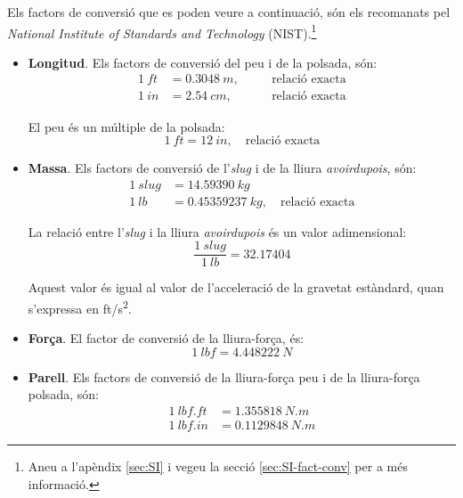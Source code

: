 Els factors de conversió que es poden veure a continuació, són els recomanats pel \textit{National Institute of Standards and Technology} (NIST).\footnote{Aneu a l'apèndix \ref{sec:SI} i vegeu la secció \ref{sec:SI-fact-conv} per a més informació.}

\begin{itemize}
    \item \textbf{Longitud}. Els factors de conversió del peu i de la polsada, són:
    \begin{subequations}
    \begin{alignat}{3}
      \qty{1}{ft} &= \qty{0,3048}{m}, &&\quad\text{relació exacta} \\
      \qty{1}{in} &= \qty{2,54}{cm}, &&\quad\text{relació exacta}
    \end{alignat}
    \end{subequations}

    El peu és un múltiple  de la polsada:
    \begin{equation}
      \qty{1}{ft} = \qty{12}{in},\quad\text{relació exacta}
    \end{equation}

    \item \textbf{Massa}. Els factors de conversió de l'\textit{slug}  i de la lliura \textit{avoirdupois}, són:
    \begin{subequations}
    \begin{align}
      \qty{1}{slug} &= \qty{14,59390}{kg} \\
      \qty{1}{lb} &= \qty{0,45359237}{kg},\quad\text{relació exacta}
    \end{align}
    \end{subequations}

    La relació entre l'\textit{slug} i la lliura \textit{avoirdupois} és un valor adimensional:
    \begin{equation}
        \frac{\qty{1}{slug}}{\qty{1}{lb}}=\num{32,17404}
    \end{equation}

    Aquest valor és igual al valor de l'acceleració de la gravetat estàndard, quan s'expressa en \unit{ft/s^2}.

    \item \textbf{Força}. El factor de conversió de la lliura-força, és:
    \begin{equation}
        \qty{1}{lbf} = \qty{4,448222}{N}
    \end{equation}

    \item \textbf{Parell}. Els factors de conversió de la lliura-força peu  i de la lliura-força polsada, són:
    \begin{subequations}
    \begin{align}
      \qty{1}{lbf.ft} &= \qty{1,355818}{N.m} \\
      \qty{1}{lbf.in} &= \qty{0,1129848}{N.m}
    \end{align}
    \end{subequations}


\end{itemize}
